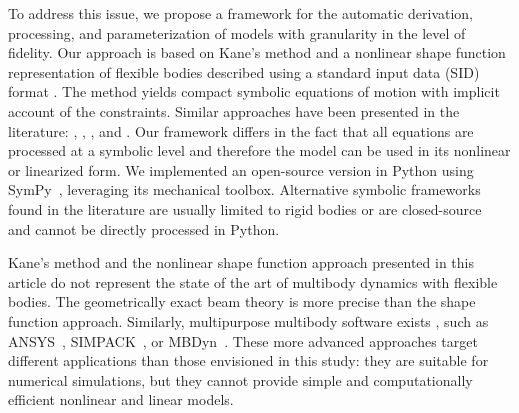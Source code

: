\documentclass[wes, manuscript]{copernicus}
\begin{document}



To address this issue, we propose a framework for the automatic derivation, processing, and
parameterization of models with granularity in the level of fidelity.
Our approach is based on Kane’s method \citep{kane:1965} and a nonlinear shape function representation of flexible bodies \citep{shabana:book}
 described using a standard input data (SID) format \citep{Wallrapp:1994, Schwertassek:book}.
The method yields compact symbolic equations of motion with implicit account of the constraints. 
Similar approaches have been presented in the literature: \cite{Kurtz:2009}, \cite{Merz:2018}, \cite{Lemmer:2018}, and \cite{branlard:2019flex}.
Our framework differs in the fact that all equations are processed at a symbolic level and therefore the model can be used in its nonlinear or linearized form. 
We implemented an open-source version in Python using SymPy~\citep{sympy},  leveraging its mechanical toolbox.
Alternative symbolic frameworks found in the literature are usually limited to rigid bodies \citep{Verlinden:2005,Kurtz:2009,Gede:2013,Docquier:2013} or are closed-source~\citep{Autolev,NeweulM2,MotionGenesis} and cannot be directly processed in Python. 

Kane's method and the nonlinear shape function approach presented in this article do not represent the state of the art of multibody dynamics with flexible bodies. 
The geometrically exact beam theory \citep{Simo:1985,Jelenic:1999,Geradin:2001:book,Bauchau:2011:book} is more precise than the shape function approach. 
Similarly, multipurpose multibody software exists \citep{Lange:2007}, such as ANSYS~\citep{ansys}, SIMPACK~\citep{simpack}, or MBDyn~\citep{MBDyn}. 
These more advanced approaches target different applications than those envisioned in this study: they are suitable for numerical simulations, but they cannot provide simple and computationally efficient nonlinear and linear models.
\end{document}
